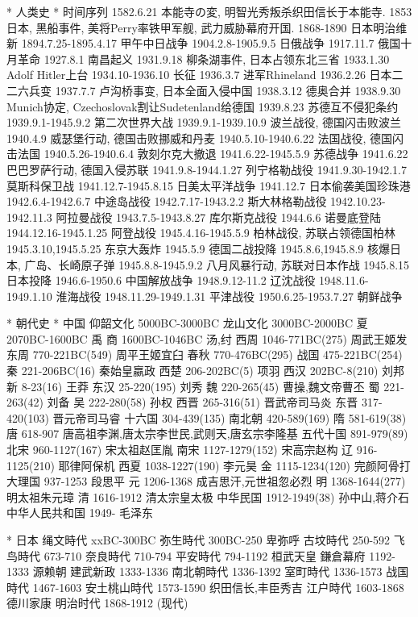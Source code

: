 * 人类史
	* 时间序列
		1582.6.21	本能寺の変, 明智光秀叛杀织田信长于本能寺.
		1853	日本, 黑船事件, 美将Perry率铁甲军舰, 武力威胁幕府开国.
		1868-1890	日本明治维新
		1894.7.25-1895.4.17	甲午中日战争
		1904.2.8-1905.9.5	日俄战争
		1917.11.7	俄国十月革命
		1927.8.1	南昌起义
		1931.9.18	柳条湖事件, 日本占领东北三省
		1933.1.30	Adolf Hitler上台
		1934.10-1936.10	长征
		1936.3.7	进军Rhineland
		1936.2.26	日本二二六兵变
		1937.7.7	卢沟桥事变, 日本全面入侵中国
		1938.3.12	德奥合并
		1938.9.30	Munich协定, Czechoslovak割让Sudetenland给德国
		1939.8.23	苏德互不侵犯条约
		1939.9.1-1945.9.2	第二次世界大战
		1939.9.1-1939.10.9	波兰战役, 德国闪击败波兰
		1940.4.9	威瑟堡行动, 德国击败挪威和丹麦
		1940.5.10-1940.6.22	法国战役, 德国闪击法国
		1940.5.26-1940.6.4	敦刻尔克大撤退
		1941.6.22-1945.5.9	苏德战争
		1941.6.22	巴巴罗萨行动, 德国入侵苏联
		1941.9.8-1944.1.27	列宁格勒战役
		1941.9.30-1942.1.7	莫斯科保卫战
		1941.12.7-1945.8.15	日美太平洋战争
		1941.12.7	日本偷袭美国珍珠港
		1942.6.4-1942.6.7	中途岛战役
		1942.7.17-1943.2.2	斯大林格勒战役
		1942.10.23-1942.11.3	阿拉曼战役
		1943.7.5-1943.8.27	库尔斯克战役
		1944.6.6	诺曼底登陆
		1944.12.16-1945.1.25	阿登战役
		1945.4.16-1945.5.9	柏林战役, 苏联占领德国柏林
		1945.3.10,1945.5.25	东京大轰炸
		1945.5.9	德国二战投降
		1945.8.6,1945.8.9	核爆日本, 广岛、长崎原子弹
		1945.8.8-1945.9.2	八月风暴行动, 苏联对日本作战
		1945.8.15	日本投降
		1946.6-1950.6	中国解放战争
		1948.9.12-11.2	辽沈战役
		1948.11.6-1949.1.10	淮海战役
		1948.11.29-1949.1.31	平津战役
		1950.6.25-1953.7.27	朝鲜战争

	* 朝代史
		* 中国
			仰韶文化	5000BC-3000BC
			龙山文化	3000BC-2000BC
			夏	2070BC-1600BC	禹
			商	1600BC-1046BC	汤,纣
			西周	1046-771BC(275)	周武王姬发
			东周	770-221BC(549)	周平王姬宜臼
			春秋	770-476BC(295)	
			战国	475-221BC(254)	
			秦	221-206BC(16)	秦始皇嬴政
			西楚	206-202BC(5)	项羽
			西汉	202BC-8(210)	刘邦
			新	8-23(16) 	王莽
			东汉	25-220(195)	刘秀
			魏	220-265(45)	曹操,魏文帝曹丕
			蜀	221-263(42)	刘备
			吴	222-280(58)	孙权
			西晋	265-316(51)	晋武帝司马炎
			东晋	317-420(103)	晋元帝司马睿
			十六国	304-439(135)	
			南北朝	420-589(169)
			隋	581-619(38)
			唐	618-907 	唐高祖李渊,唐太宗李世民,武则天,唐玄宗李隆基
			五代十国	891-979(89)
			北宋	960-1127(167)	宋太祖赵匡胤
			南宋	1127-1279(152)	宋高宗赵构
			辽	916-1125(210)	耶律阿保机
			西夏	1038-1227(190)	李元昊
			金	1115-1234(120)	完颜阿骨打
			大理国	937-1253	段思平
			元	1206-1368	成吉思汗,元世祖忽必烈
			明	1368-1644(277)	明太祖朱元璋
			清	1616-1912	清太宗皇太极
			中华民国	1912-1949(38)	孙中山,蒋介石
			中华人民共和国	1949-	毛泽东

		* 日本
			绳文時代	xxBC-300BC
			弥生時代	300BC-250	卑弥呼
			古坟時代	250-592
			飞鸟時代	673-710
			奈良時代    710-794
			平安時代	794-1192	桓武天皇
			鎌倉幕府	1192-1333	源赖朝
			建武新政	1333-1336
			南北朝時代	1336-1392
			室町時代	1336-1573
			战国時代	1467-1603	
			安土桃山時代	1573-1590	织田信长,丰臣秀吉
			江户時代	1603-1868	德川家康
			明治时代	1868-1912	
			(现代)
		
